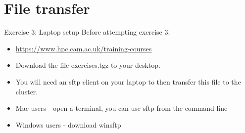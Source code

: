 \documentclass[handout]{beamer} %
\begin{document}
{
\section{File transfer}
%
\begin{frame}{Exercise 3: Laptop setup}
Before attempting exercise 3:
\begin{itemize}
\item{\url{https://www.hpc.cam.ac.uk/training-courses}}
\item{Download the file \alert{exercises.tgz} to your desktop.}
\item{You will need an sftp client on your laptop to then transfer this file to the cluster.}
\item{Mac users - open a terminal, you can use sftp from the command line}
\item{Windows users - download winsftp}
\end{itemize}
\end{frame}
}
\end{document}
